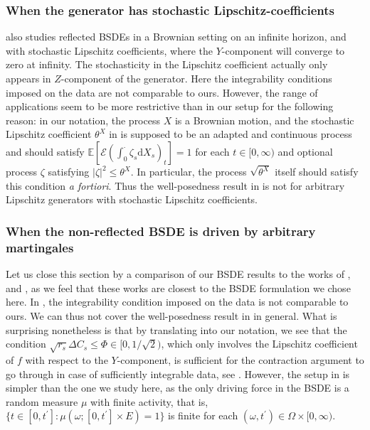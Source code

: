 \documentclass[10pt]{article} %
\newcommand\cE{\mathcal E}
\def \E{\mathbb{E}}
\def\d{\mathrm{d}}
\begin{document}
\subsubsection{When the generator has stochastic Lipschitz-coefficients}

\citeauthor*{perninge2021note} \cite{perninge2021note} also studies reflected BSDEs in a Brownian setting on an infinite horizon, and with stochastic Lipschitz coefficients, where the $Y$-component will converge to zero at infinity. The stochasticity in the Lipschitz coefficient actually only appears in $Z$-component of the generator. Here the integrability conditions imposed on the data are not comparable to ours. However, the range of applications seem to be more restrictive than in our setup for the following reason: in our notation, the process $X$ is a Brownian motion, and the stochastic Lipschitz coefficient $\theta^X$ in \cite{perninge2021note} is supposed to be an adapted and continuous process and should satisfy $\E[\cE(\int_0^\cdot \zeta_s\d X_s)_t] = 1$ for each $t \in [0,\infty)$ and optional process $\zeta$ satisfying $|\zeta|^2 \leq \theta^X$. In particular, the process $\sqrt{\theta^X}$ itself should satisfy this condition \emph{a fortiori}. Thus the well-posedness result in \cite{perninge2021note} is not for arbitrary Lipschitz generators with stochastic Lipschitz coefficients.


\subsubsection{When the non-reflected BSDE is driven by arbitrary martingales}

Let us close this section by a comparison of our BSDE results to the works of \citeauthor*{bandini2015existence} \cite{bandini2015existence}, \citeauthor*{cohen2012existence} \cite{cohen2012existence} and \citeauthor*{papapantoleon2018existence} \cite{papapantoleon2018existence}, as we feel that these works are closest to the BSDE formulation we chose here. In \cite{bandini2015existence}, the integrability condition imposed on the data is not comparable to ours. We can thus not cover the well-posedness result in \cite{bandini2015existence} in general. What is surprising nonetheless is that by translating \cite{bandini2015existence} into our notation, we see that the condition $\sqrt{r_s}\Delta C_s \leq \Phi \in [0,1/\sqrt{2})$, which only involves the Lipschitz coefficient of $f$ with respect to the $Y$-component, is sufficient for the contraction argument to go through in case of sufficiently integrable data, see \cite[Theorem 4.1]{bandini2015existence}. However, the setup in \cite{bandini2015existence} is simpler than the one we study here, as the only driving force in the BSDE is a random measure $\mu$ with finite activity, that is, $\{t \in [0,t^\prime] : \mu(\omega; [0,t^\prime] \times E) = 1\}$ is finite for each $(\omega,t^\prime) \in \Omega \times [0,\infty)$. 
\end{document}
